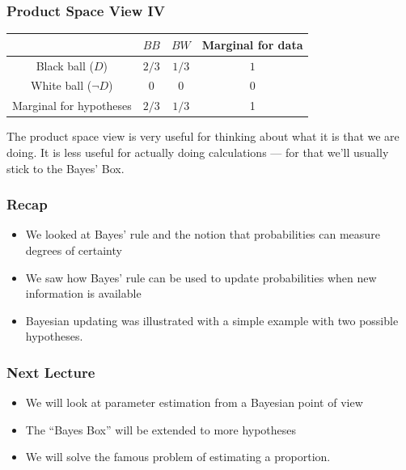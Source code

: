 \documentclass{beamer}
\begin{document}
\begin{frame}
\frametitle{Product Space View IV}
\begin{center}
\begin{tabular}{|c|cc|c|}
\hline
   &  $BB$ &  $BW$ & Marginal for data\\
\hline
\rowcolor{LightGreen}
Black ball ($D$)      &  $2/3$  &  $1/3$     & $1$\\
\rowcolor{LightRed}
White ball ($\neg D$) &  0      &  0     & 0 \\
\hline
Marginal for hypotheses  &  $2/3$  & $1/3$  & 1\\
\hline
\end{tabular}
\end{center}

\pause
The product space view is very useful for thinking about
what it is that we are doing. It is less useful for actually
doing calculations --- for that we'll usually stick to the Bayes'
Box.
\end{frame}


\begin{frame}
\frametitle{Recap}

\begin{itemize}
\item We looked at Bayes' rule and the notion that probabilities
can measure degrees of certainty
\item We saw how Bayes' rule can be used to update
probabilities when new information is available
\item Bayesian updating was illustrated with a simple example
with two possible hypotheses.
\end{itemize}

\end{frame}

\begin{frame}
\frametitle{Next Lecture}

\begin{itemize}
\item We will look at parameter estimation from a Bayesian
point of view
\item The ``Bayes Box'' will be extended to more hypotheses
\item We will solve the famous problem of estimating a
proportion.
\end{itemize}

\end{frame}
\end{document}

